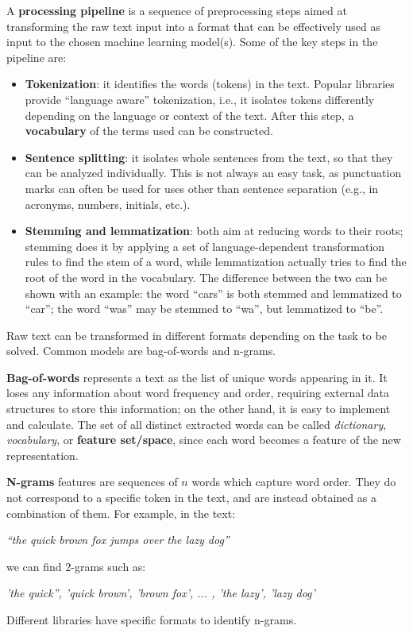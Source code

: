 A \textbf{processing pipeline} is a sequence of preprocessing steps aimed at transforming the raw text input into a format that can be effectively used as input to the chosen machine learning model(s). Some of the key steps in the pipeline are:
\begin{itemize}
    \item \textbf{Tokenization}: it identifies the words (tokens) in the text. Popular libraries provide ``language aware'' tokenization, i.e., it isolates tokens differently depending on the language or context of the text. After this step, a \textbf{vocabulary} of the terms used can be constructed.
    \item \textbf{Sentence splitting}: it isolates whole sentences from the text, so that they can be analyzed individually. This is not always an easy task, as punctuation marks can often be used for uses other than sentence separation (e.g., in acronyms, numbers, initials, etc.).
    \item \textbf{Stemming and lemmatization}: both aim at reducing words to their roots; stemming does it by applying a set of language-dependent transformation rules to find the stem of a word, while lemmatization actually tries to find the root of the word in the vocabulary. The difference between the two can be shown with an example: the word ``cars'' is both stemmed and lemmatized to ``car''; the word ``was'' may be stemmed to ``wa'', but lemmatized to ``be''.
\end{itemize}
Raw text can be transformed in different formats depending on the task to be solved. Common models are bag-of-words and n-grams.

\textbf{Bag-of-words} represents a text as the list of unique words appearing in it. It loses any information about word frequency and order, requiring external data structures to store this information; on the other hand, it is easy to implement and calculate. The set of all distinct extracted words can be called \textit{dictionary}, \textit{vocabulary}, or \textbf{feature set/space}, since each word becomes a feature of the new representation.

\textbf{N-grams} features are sequences of $n$ words which capture word order. They do not correspond to a specific token in the text, and are instead obtained as a combination of them. For example, in the text:
\begin{center}
    \textit{``the quick brown fox jumps over the lazy dog''}
\end{center}
we can find 2-grams such as:
\begin{center}
    \textit{'the quick'', 'quick brown', 'brown fox', ... , 'the lazy', 'lazy dog'}
\end{center}
Different libraries have specific formats to identify n-grams.


